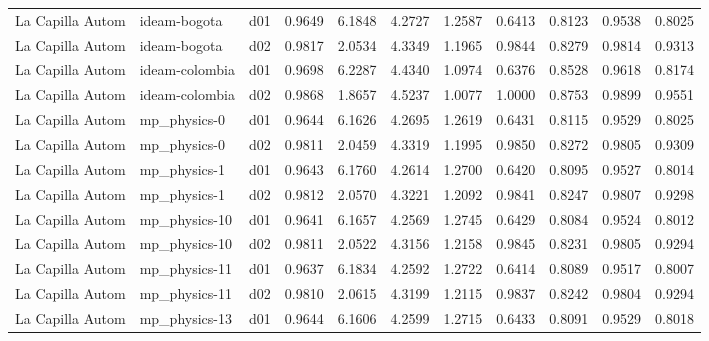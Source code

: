 \begin{longtable}{lllrrrrrrrr}
     La Capilla Autom  &          ideam-bogota &     d01 &   0.9649 &   6.1848 &   4.2727 &       1.2587 &        0.6413 &       0.8123 &           0.9538 &  0.8025 \\
     La Capilla Autom  &          ideam-bogota &     d02 &   0.9817 &   2.0534 &   4.3349 &       1.1965 &        0.9844 &       0.8279 &           0.9814 &  0.9313 \\
     La Capilla Autom  &        ideam-colombia &     d01 &   0.9698 &   6.2287 &   4.4340 &       1.0974 &        0.6376 &       0.8528 &           0.9618 &  0.8174 \\
     La Capilla Autom  &        ideam-colombia &     d02 &   0.9868 &   1.8657 &   4.5237 &       1.0077 &        1.0000 &       0.8753 &           0.9899 &  0.9551 \\
     La Capilla Autom  &          mp\_physics-0 &     d01 &   0.9644 &   6.1626 &   4.2695 &       1.2619 &        0.6431 &       0.8115 &           0.9529 &  0.8025 \\
     La Capilla Autom  &          mp\_physics-0 &     d02 &   0.9811 &   2.0459 &   4.3319 &       1.1995 &        0.9850 &       0.8272 &           0.9805 &  0.9309 \\
     La Capilla Autom  &          mp\_physics-1 &     d01 &   0.9643 &   6.1760 &   4.2614 &       1.2700 &        0.6420 &       0.8095 &           0.9527 &  0.8014 \\
     La Capilla Autom  &          mp\_physics-1 &     d02 &   0.9812 &   2.0570 &   4.3221 &       1.2092 &        0.9841 &       0.8247 &           0.9807 &  0.9298 \\
     La Capilla Autom  &         mp\_physics-10 &     d01 &   0.9641 &   6.1657 &   4.2569 &       1.2745 &        0.6429 &       0.8084 &           0.9524 &  0.8012 \\
     La Capilla Autom  &         mp\_physics-10 &     d02 &   0.9811 &   2.0522 &   4.3156 &       1.2158 &        0.9845 &       0.8231 &           0.9805 &  0.9294 \\
     La Capilla Autom  &         mp\_physics-11 &     d01 &   0.9637 &   6.1834 &   4.2592 &       1.2722 &        0.6414 &       0.8089 &           0.9517 &  0.8007 \\
     La Capilla Autom  &         mp\_physics-11 &     d02 &   0.9810 &   2.0615 &   4.3199 &       1.2115 &        0.9837 &       0.8242 &           0.9804 &  0.9294 \\
     La Capilla Autom  &         mp\_physics-13 &     d01 &   0.9644 &   6.1606 &   4.2599 &       1.2715 &        0.6433 &       0.8091 &           0.9529 &  0.8018 \\

\end{longtable}
